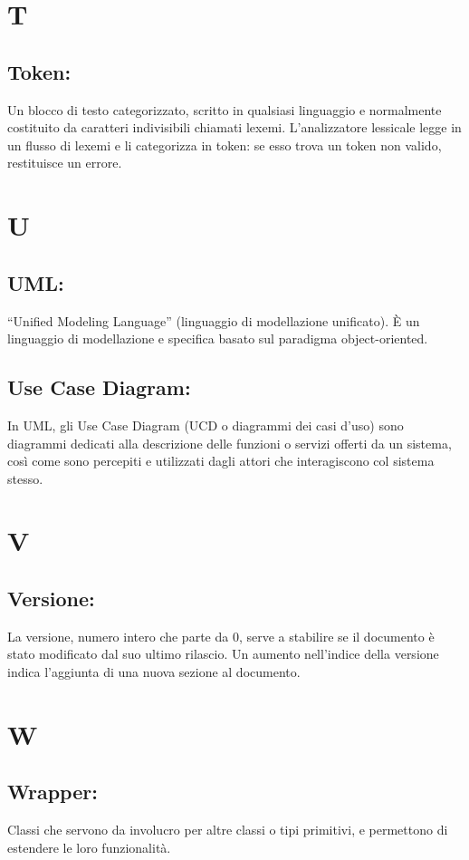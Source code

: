 \chapter{T}
\section{Token:}
Un blocco di testo categorizzato, scritto in qualsiasi linguaggio e normalmente costituito da caratteri indivisibili chiamati lexemi. L'analizzatore lessicale legge in un flusso di lexemi e li categorizza in token: se esso trova un token non valido, restituisce un errore.

\chapter{U}
\section{UML:}
``Unified Modeling Language'' (linguaggio di modellazione unificato). \`E un linguaggio di modellazione e specifica basato sul paradigma object-oriented.
\section{Use Case Diagram:}
In UML, gli Use Case Diagram (UCD o diagrammi dei casi d'uso) sono diagrammi dedicati alla descrizione delle funzioni o servizi offerti da un sistema, cos\`i come sono percepiti e utilizzati dagli attori che interagiscono col sistema stesso. 

\chapter{V}
\section{Versione:}
La versione, numero intero che parte da 0, serve a stabilire se il documento \`e stato modificato dal suo ultimo rilascio. Un aumento nell'indice della versione indica l'aggiunta di una nuova sezione al documento.

\chapter{W}
\hypertarget{wrapper}{}
\section{Wrapper:}
Classi che servono da involucro per altre classi o tipi primitivi, e permettono di estendere le loro funzionalit\`a.

